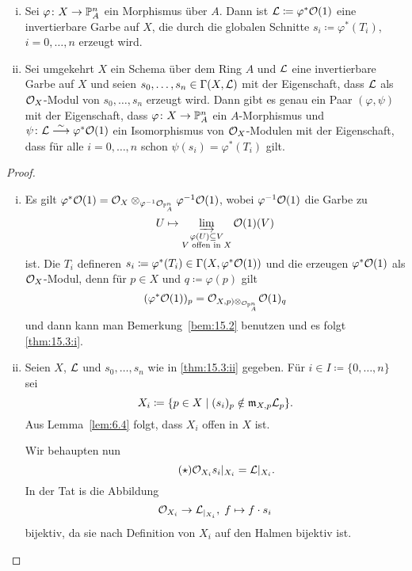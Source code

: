 \begin{thm}
\label{thm:15.3}
	\begin{enumerate}[i)]
		\item\label{thm:15.3:i} Sei $\varphi\colon X \to \P^n_A$ ein Morphismus über $A$. Dann ist $\mcl \coloneqq \varphi^*\mco(1)$ eine invertierbare Garbe auf $X$, die durch die globalen Schnitte $s_i\coloneqq \varphi^*(T_i)$, $i =0,\ldots,n$ erzeugt wird.
		\item\label{thm:15.3:ii} Sei umgekehrt $X$ ein Schema über dem Ring $A$ und $\mcl$ eine invertierbare Garbe auf $X$ und seien $s_0,\ldots,s_n \in \Gamma(X,\mcl)$ mit der Eigenschaft, dass $\mcl$ als $\mco_X$-Modul von $s_0,\ldots,s_n$ erzeugt wird. Dann gibt es genau ein Paar $(\varphi, \psi)$ mit der Eigenschaft, dass $\varphi\colon X \to \P^n_A$ ein $A$-Morphismus und $\psi\colon \mcl \simto \varphi^*\mco(1)$ ein Isomorphismus von $\mco_X$-Modulen mit der Eigenschaft, dass für alle $i=0,\ldots,n$ schon $\psi(s_i) = \varphi^*(T_i)$ gilt.
	\end{enumerate}
	\begin{proof}
		\begin{enumerate}[i)]
			\item Es gilt $\varphi^*\mco(1) = \mco_X\otimes_{\varphi^{-1}\mco_{\P^n_A}}\varphi^{-1}\mco(1)$, wobei $\varphi^{-1}\mco(1)$ die Garbe zu
			\[
				U \mapsto \varinjlim_{\substack{\varphi(U) \subseteq V\\V\text{ offen in }X}}\mco(1)(V)
			\]
			ist. Die $T_i$ defineren $s_i\coloneqq \varphi^*(T_i) \in \Gamma(X,\varphi^*\mco(1))$ und die erzeugen $\varphi^*\mco(1)$ als $\mco_X$-Modul, denn für $p \in X$ und $q\coloneqq \varphi(p)$ gilt
			\[
				(\varphi^*\mco(1))_p = \mco_{X,p)\otimes_{\mco_{\P_A^n}}}\mco(1)_q
			\]
			und dann kann man Bemerkung~\ref{bem:15.2} benutzen und es folgt \ref{thm:15.3:i}.
			\item Seien $X$, $\mcl$ und $s_0,\ldots,s_n$ wie in \ref{thm:15.3:ii} gegeben. Für $i \in I\coloneqq \{0,\ldots,n\}$ sei
			\[
				X_i \coloneqq \{p \in X \mid (s_i)_p \notin \mfm_{X,p}\mcl_p\}.
			\]
			Aus Lemma~\ref{lem:6.4} folgt, dass $X_i$ offen in $X$ ist.

			Wir behaupten nun
			\[\label{eq:15.3.1}\tag{$\star$}
				\mco_{X_i} s_i\vert_{X_i} = \mcl\vert_{X_i}.
			\]
			In der Tat is die Abbildung
			\[
				\mco_{X_i}\to \mcl_{\vert_{X_i}},\; f \mapsto f \cdot s_i
			\]
			bijektiv, da sie nach Definition von $X_i$ auf den Halmen bijektiv ist.


\end{enumerate}
\end{proof}
\end{thm}
